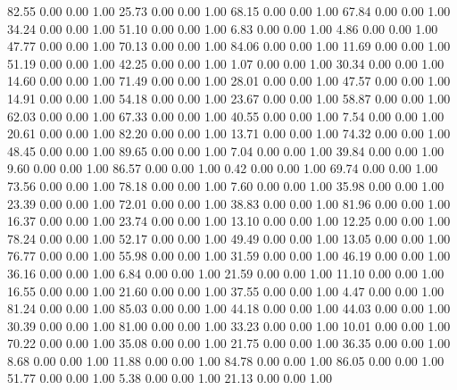    82.55   0.00   0.00   1.00
   25.73   0.00   0.00   1.00
   68.15   0.00   0.00   1.00
   67.84   0.00   0.00   1.00
   34.24   0.00   0.00   1.00
   51.10   0.00   0.00   1.00
    6.83   0.00   0.00   1.00
    4.86   0.00   0.00   1.00
   47.77   0.00   0.00   1.00
   70.13   0.00   0.00   1.00
   84.06   0.00   0.00   1.00
   11.69   0.00   0.00   1.00
   51.19   0.00   0.00   1.00
   42.25   0.00   0.00   1.00
    1.07   0.00   0.00   1.00
   30.34   0.00   0.00   1.00
   14.60   0.00   0.00   1.00
   71.49   0.00   0.00   1.00
   28.01   0.00   0.00   1.00
   47.57   0.00   0.00   1.00
   14.91   0.00   0.00   1.00
   54.18   0.00   0.00   1.00
   23.67   0.00   0.00   1.00
   58.87   0.00   0.00   1.00
   62.03   0.00   0.00   1.00
   67.33   0.00   0.00   1.00
   40.55   0.00   0.00   1.00
    7.54   0.00   0.00   1.00
   20.61   0.00   0.00   1.00
   82.20   0.00   0.00   1.00
   13.71   0.00   0.00   1.00
   74.32   0.00   0.00   1.00
   48.45   0.00   0.00   1.00
   89.65   0.00   0.00   1.00
    7.04   0.00   0.00   1.00
   39.84   0.00   0.00   1.00
    9.60   0.00   0.00   1.00
   86.57   0.00   0.00   1.00
    0.42   0.00   0.00   1.00
   69.74   0.00   0.00   1.00
   73.56   0.00   0.00   1.00
   78.18   0.00   0.00   1.00
    7.60   0.00   0.00   1.00
   35.98   0.00   0.00   1.00
   23.39   0.00   0.00   1.00
   72.01   0.00   0.00   1.00
   38.83   0.00   0.00   1.00
   81.96   0.00   0.00   1.00
   16.37   0.00   0.00   1.00
   23.74   0.00   0.00   1.00
   13.10   0.00   0.00   1.00
   12.25   0.00   0.00   1.00
   78.24   0.00   0.00   1.00
   52.17   0.00   0.00   1.00
   49.49   0.00   0.00   1.00
   13.05   0.00   0.00   1.00
   76.77   0.00   0.00   1.00
   55.98   0.00   0.00   1.00
   31.59   0.00   0.00   1.00
   46.19   0.00   0.00   1.00
   36.16   0.00   0.00   1.00
    6.84   0.00   0.00   1.00
   21.59   0.00   0.00   1.00
   11.10   0.00   0.00   1.00
   16.55   0.00   0.00   1.00
   21.60   0.00   0.00   1.00
   37.55   0.00   0.00   1.00
    4.47   0.00   0.00   1.00
   81.24   0.00   0.00   1.00
   85.03   0.00   0.00   1.00
   44.18   0.00   0.00   1.00
   44.03   0.00   0.00   1.00
   30.39   0.00   0.00   1.00
   81.00   0.00   0.00   1.00
   33.23   0.00   0.00   1.00
   10.01   0.00   0.00   1.00
   70.22   0.00   0.00   1.00
   35.08   0.00   0.00   1.00
   21.75   0.00   0.00   1.00
   36.35   0.00   0.00   1.00
    8.68   0.00   0.00   1.00
   11.88   0.00   0.00   1.00
   84.78   0.00   0.00   1.00
   86.05   0.00   0.00   1.00
   51.77   0.00   0.00   1.00
    5.38   0.00   0.00   1.00
   21.13   0.00   0.00   1.00
